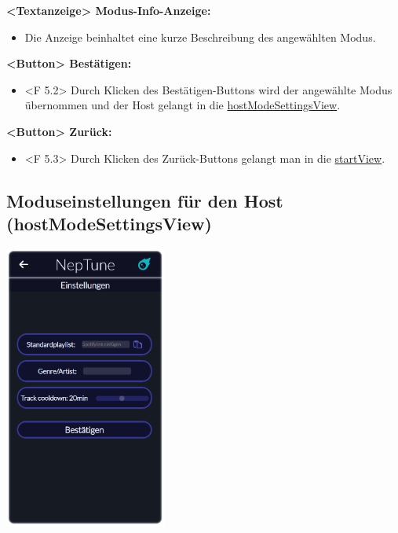 \documentclass[oneside, ngerman]{sdqtechreport}
\begin{document}
\textbf{<Textanzeige> Modus-Info-Anzeige:}
\begin{itemize}
    \item Die Anzeige beinhaltet eine kurze Beschreibung des angewählten Modus.
\end{itemize}

\textbf{<Button> Bestätigen:}
\begin{itemize}
    \item <F 5.2> Durch Klicken des Bestätigen-Buttons wird der angewählte Modus übernommen und der Host gelangt in die \hyperlink{hostModeSettingsView}{hostModeSettingsView}.
\end{itemize}

\textbf{<Button> Zurück:}
\begin{itemize}
    \item <F 5.3> Durch Klicken des Zurück-Buttons gelangt man in die  \hyperlink{startView}{startView}.
\end{itemize}



\subsection{Moduseinstellungen für den Host (hostModeSettingsView)}
\label{sec:Benutzeroberfläche:hostModeSettingsView}

\begin{center}
    \hypertarget{hostModeSettingsView}{}
    \includegraphics[width=0.4\textwidth]{LATEX/Pflichtenheft/GraphicDesigns/hostModusSettingsPage.png}
\end{center}
\end{document}
